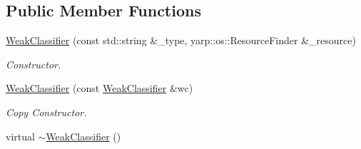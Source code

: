 \subsection*{Public Member Functions}
\begin{DoxyCompactItemize}
\item 
\hyperlink{classiCub_1_1boostMIL_1_1WeakClassifier_a0eda1adfb456d3e5b39f8aed98516f21}{Weak\+Classifier} (const std\+::string \&\+\_\+type, yarp\+::os\+::\+Resource\+Finder \&\+\_\+resource)
\begin{DoxyCompactList}\small\item\em Constructor. \end{DoxyCompactList}\item 
\hyperlink{classiCub_1_1boostMIL_1_1WeakClassifier_a4c6473cb9a3347b6ade6f80af375cb82}{Weak\+Classifier} (const \hyperlink{classiCub_1_1boostMIL_1_1WeakClassifier}{Weak\+Classifier} \&wc)
\begin{DoxyCompactList}\small\item\em Copy Constructor. \end{DoxyCompactList}\item 
virtual \hyperlink{classiCub_1_1boostMIL_1_1WeakClassifier_ab43a4ceade45e30b7fed78a60333cbd5}{$\sim$\+Weak\+Classifier} ()\label{classiCub_1_1boostMIL_1_1WeakClassifier_ab43a4ceade45e30b7fed78a60333cbd5}


\end{DoxyCompactItemize}
